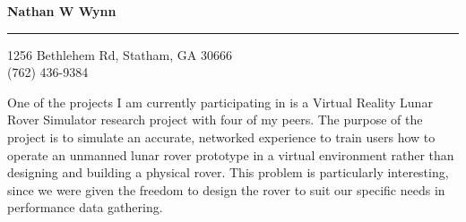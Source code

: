 \documentclass{letter} %
\begin{document}
\signature{Nathan W Wynn}           %
\longindentation=0pt                       %
\let\raggedleft\raggedright                %
 
 
\begin{letter}%


\begin{flushleft}
{\large\bf Nathan W Wynn}
\end{flushleft}
\medskip\hrule height 1pt
\begin{flushright}
\hfill 1256 Bethlehem Rd, Statham, GA 30666 \\
\hfill (762) 436-9384
\end{flushright} 
\vfill %

 
\noindent One of the projects I am currently participating in is a Virtual Reality Lunar Rover Simulator research project with four of my peers. The purpose of the project is to simulate an accurate, networked experience to train users how to operate an unmanned lunar rover prototype in a virtual environment rather than designing and building a physical rover. This problem is particularly interesting, since we were given the freedom to design the rover to suit our specific needs in performance data gathering.


\end{letter}
\end{document}

